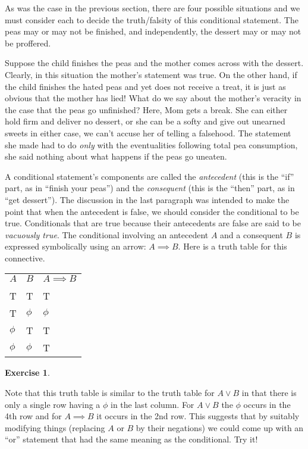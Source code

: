 \documentclass[10pt,]{book}
\theoremstyle{plain}
\theoremstyle{definition}
\theoremstyle{definition}
\newtheorem{exercise}[theorem]{Exercise}
\numberwithin{equation}{section}
\newcommand{\hrulethin}  {\noalign{\hrule height 0.04em}}
\begin{document}
    As was the case in the previous section, there are four possible
    situations and we must consider each to decide the truth/falsity
    of this conditional statement. The peas may or may not be finished,
    and independently, the dessert may or may not be proffered.
\par

    Suppose the child finishes the peas and the mother comes across
    with the dessert. Clearly, in this situation the mother's statement
    was true. On the other hand, if the child finishes the hated peas
    and yet does not receive a treat, it is just as obvious that the
    mother has lied!
    What do we say about the mother's veracity in the case that the peas
    go unfinished? Here, Mom gets a break. She can either hold firm
    and deliver no dessert, or she can be a softy and give out unearned
    sweets \textemdash{} in either case, we can't accuse her of telling a falsehood.
    The statement she made had to do \emph{only} with the eventualities
    following total pea consumption, she said nothing about what happens
    if the peas go uneaten.
\par

    A conditional statement's components are called the
    \emph{antecedent}
    (this is the ``if'' part, as in ``finish
    your peas'') and the \emph{consequent} (this is the ``then'' part, as in
    ``get dessert''). The discussion in the
    last paragraph was intended to make the point that when the antecedent
    is false, we should consider the conditional to be true. Conditionals
    that are true because their antecedents are false are said to
    be \emph{vacuously true}. The conditional
    involving an antecedent \(A\)
    and a consequent \(B\) is expressed symbolically using an arrow:
    \(A \implies B\). Here is a truth table for this connective.
\begin{tabular}{lll}
\(A\)&\(B\)&\(A \implies B\)\tabularnewline[0pt]
&&\tabularnewline\hrulethin
T&T&T\tabularnewline[0pt]
T&\(\phi\)&\(\phi\)\tabularnewline[0pt]
\(\phi\)&T&T\tabularnewline[0pt]
\(\phi\)&\(\phi\)&T
\end{tabular}
\begin{exercise}\label{exercise-8}

        Note that this truth table is similar to the truth table for
        \(A \lor B\) in that there is only a single row having a \(\phi\) in
        the last column. For \(A \lor B\) the \(\phi\) occurs in the 4th row
        and for \(A \implies B\) it occurs in the 2nd row. This suggests
        that by suitably modifying things (replacing \(A\) or \(B\) by their
        negations) we could come up with an ``or'' statement that had the
        same meaning as the conditional. Try it!
\end{exercise}
\par
\end{document}
